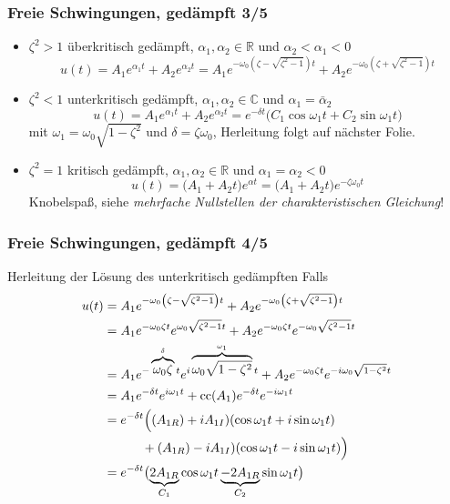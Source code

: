 \documentclass[hyperref={pdfpagemode=FullScreen, colorlinks=false}]{beamer}
\begin{document}
\begin{frame}
\frametitle{Freie Schwingungen, {\normalsize gedämpft 3/5}}
\begin{itemize}[<+->]

\item $\zeta^2>1$ überkritisch gedämpft, $\alpha_1, \alpha_2 \in \mathbb{R}$ und $\alpha_2 < \alpha_1 < 0$  
 \begin{equation*}
 u(t)=A_1 e^{\alpha_1 t}+ A_2 e^{\alpha_2 t}
 =A_1 e^{-\omega_0\left(\zeta-\sqrt{\zeta^2-1}\right)t}
 +A_2 e^{-\omega_0\left(\zeta+\sqrt{\zeta^2-1}\right)t}
 \end{equation*}
 
 \item $\zeta^2<1$ unterkritisch gedämpft, $\alpha_1, \alpha_2 \in \mathbb{C}$ und $\alpha_1=\bar{\alpha}_2$  
 \begin{equation*}
 u(t)= A_1 e^{\alpha_1 t}+ A_2 e^{\alpha_2 t}
 =e^{-\delta t}\bigl( C_1\cos\omega_1 t + C_2\sin\omega_1 t \bigr)
 \end{equation*}
 mit $\omega_1=\omega_0\sqrt{1- \zeta^2}$ und $\delta=\zeta\omega_0$, Herleitung folgt auf nächster Folie.
 
 \item $\zeta^2=1$ kritisch gedämpft,  $\alpha_1, \alpha_2 \in \mathbb{R}$ und $\alpha_1=\alpha_2<0$  
 \begin{equation*}
 u(t)= \bigl( A_1+A_2 t \bigr)e^{\alpha t}
 = \bigl( A_1+A_2 t \bigr)e^{-\zeta\omega_0 t}
 \end{equation*}
 Knobelspaß, siehe \textsl{mehrfache Nullstellen der charakteristischen Gleichung}!
\end{itemize}

\end{frame}

\begin{frame}
\frametitle{Freie Schwingungen, {\normalsize gedämpft 4/5}}
Herleitung der Lösung des unterkritisch gedämpften Falls
\begin{align*}
 u(t)  &=A_1 e^{-\omega_0\left( \zeta-\sqrt{ \zeta^2-1}\right)t}
  +A_2 e^{-\omega_0\left( \zeta+\sqrt{ \zeta^2-1}\right)t}\\
  &=A_1 e^{-\omega_0 \zeta t}e^{\omega_0 \sqrt{ \zeta^2-1}t}
  +A_2 e^{-\omega_0 \zeta t}e^{-\omega_0 \sqrt{ \zeta^2-1}t}\\
  &=A_1 e^{-\overbrace{\omega_0 \zeta}^{\delta} t}e^{i\overbrace{\omega_0 \sqrt{1-\zeta^2}}^{\omega_1}t}
  +A_2 e^{-\omega_0 \zeta t}e^{-i\omega_0 \sqrt{1-\zeta^2}t}\\
  &=A_1 e^{-\delta t}e^{i\omega_1t}+\mathrm{cc}(A_1) e^{-\delta t}e^{-i\omega_1t}\\
  &= e^{-\delta t}\Bigl( (A_{1R})+i A_{1I}) (\cos\omega_1 t + i \sin \omega_1 t  )\\
  & \qquad \quad +(A_{1R})-i A_{1I}) (\cos\omega_1 t - i \sin \omega_1 t)  \Bigr)\\
  &=e^{-\delta t}\bigl( \underbrace{2A_{1R}}_{C_1}\cos \omega_1 t 
  \underbrace{- 2A_{1R}}_{C_2}\sin \omega_1 t   \bigr)
 \end{align*}
\end{frame}
\end{document}
